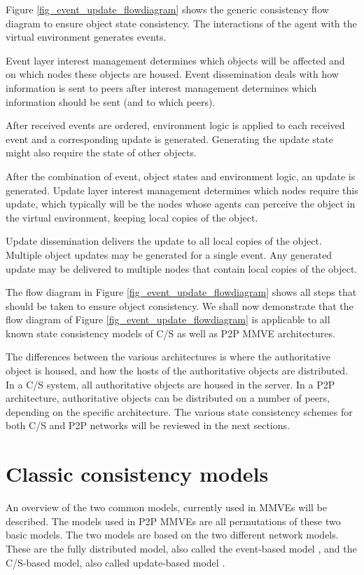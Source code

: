 Figure \ref{fig_event_update_flowdiagram} shows the generic consistency flow diagram to ensure object state consistency. The interactions of the agent with the virtual environment generates events.

Event layer interest management determines which objects will be affected and on which nodes these objects are housed. Event dissemination deals with how information is sent to peers after interest management determines which information should be sent (and to which peers).

After received events are ordered, environment logic is applied to each received event and a corresponding update is generated. Generating the update state might also require the state of other objects.

After the combination of event, object states and environment logic, an update is generated. Update layer interest management determines which nodes require this update, which typically will be the nodes whose agents can perceive the object in the virtual environment, keeping local copies of the object.

Update dissemination delivers the update to all local copies of the object. Multiple object updates may be generated for a single event. Any generated update may be delivered to multiple nodes that contain local copies of the object.

The flow diagram in Figure \ref{fig_event_update_flowdiagram} shows all steps that should be taken to ensure object consistency. We shall now demonstrate that the flow diagram of Figure \ref{fig_event_update_flowdiagram} is applicable to all known state consistency models of C/S as well as P2P MMVE architectures.

The differences between  the various architectures is where the authoritative object is housed, and how the hosts of the authoritative objects are distributed. In a C/S system, all authoritative objects are housed in the server. In a P2P architecture, authoritative objects can be distributed on a number of peers, depending on the specific architecture. The various state consistency schemes for both C/S and P2P networks will be reviewed in the next sections.

\section{Classic consistency models}
\label{classic_models}

An overview of the two common models, currently used in MMVEs will be described. The models used in P2P MMVEs are all permutations of these two basic models. The two models are based on the two different network models. These are the fully distributed model, also called the event-based model \cite{p2p_cm_aoe}, and the C/S-based model, also called update-based model
\cite{unreal_networking}.

